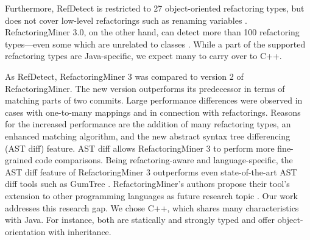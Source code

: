 Furthermore, RefDetect is restricted to 27 object-oriented refactoring types, but does not cover low-level refactorings such as renaming variables \cite{ieeeAccess21refdetect}.
RefactoringMiner 3.0, on the other hand, can detect more than 100 refactoring types---even some which are unrelated to classes \cite{tosem24refactoringMiner3}. While a part of the supported refactoring types are Java-specific, we expect many to carry over to C++.%

As RefDetect, RefactoringMiner 3 was compared to version 2 of RefactoringMiner. The new version outperforms its predecessor in terms of matching parts of two commits. Large performance differences were observed in cases with one-to-many mappings and in connection with refactorings. Reasons for the increased performance are the addition of many refactoring types, an enhanced matching algorithm, and the new abstract syntax tree differencing (AST diff) feature. AST diff allows RefactoringMiner 3 to perform more fine-grained code comparisons. Being refactoring-aware and language-specific, the AST diff feature of RefactoringMiner 3 outperforms even state-of-the-art AST diff tools \cite{tosem24refactoringMiner3} such as GumTree \cite{tose32gumtree3,icse24gumtree3}. RefactoringMiner's authors propose their tool's extension to other programming languages as future research topic \cite{tosem24refactoringMiner3}. Our work addresses this research gap. We chose C++, which shares many characteristics with Java. For instance, both are statically and strongly typed and offer object-orientation with inheritance.

